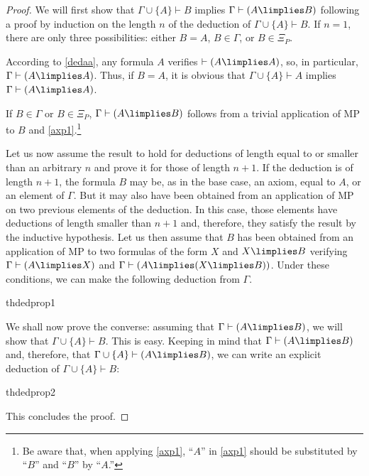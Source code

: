 \begin{proof}

We will first show that $\Gamma \cup \{A\} \vdash B$ implies $\Gamma \vdash (A\limplies B)$ following a proof by induction on the length $n$ of the deduction of $\Gamma\cup\{A\}\vdash B$.
If $n = 1$, there are only three possibilities: either $B = A$, $B\in \Gamma$, or $B\in \Xi_P$. 

According to \ref{dedaa}, any formula $A$ verifies $\vdash (A\limplies A)$, so, in particular, $\Gamma \vdash (A\limplies A)$.
Thus, if $B = A$, it is obvious that $\Gamma\cup\{A\}\vdash A$ implies $\Gamma \vdash (A\limplies A)$. 

If $B\in \Gamma$ or $B\in \Xi_P$, $\Gamma \vdash (A\limplies B)$ follows from a trivial application of MP to $B$ and \ref{axp1}.\footnote{Be aware that, when applying \ref{axp1}, ``$A$'' in \ref{axp1} should be substituted by ``$B$'' and ``$B$'' by ``$A$.''}

Let us now assume the result to hold for deductions of length equal to or smaller than an arbitrary $n$ and prove it for those of length $n+1$.
If the deduction is of length $n+1$, the formula $B$ may be, as in the base case, an axiom, equal to $A$, or an element of $\Gamma$.
But it may also have been obtained from an application of MP on two previous elements of the deduction.
In this case, those elements have deductions of length smaller than $n+1$ and, therefore, they satisfy the result by the inductive hypothesis. Let us then assume that $B$ has been obtained from an application of MP to two formulas of the form $X$ and $X\limplies B$ verifying $\Gamma \vdash (A\limplies X)$ and $\Gamma \vdash (A\limplies(X \limplies B))$. Under these conditions, we can make the following deduction from $\Gamma$.

\begin{deduction}{thdedprop1}
\end{deduction}

We shall now prove the converse: assuming that $\Gamma \vdash (A\limplies B)$, we will show that $\Gamma\cup \{A\} \vdash B$.
This is easy. Keeping in mind that $\Gamma \vdash (A\limplies B)$ and, therefore, that $\Gamma\cup\{A\}\vdash (A\limplies B)$, we can write an explicit deduction of $\Gamma\cup\{A\}\vdash B$:
\begin{deduction}{thdedprop2}
\end{deduction}
This concludes the proof.
\end{proof}

